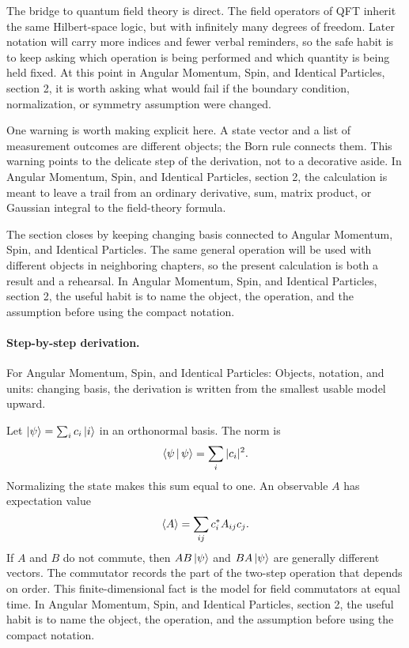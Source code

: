 The bridge to quantum field theory is direct.  The field operators of QFT inherit the same Hilbert-space logic, but with infinitely many degrees of freedom.  Later notation will carry more indices and fewer verbal reminders, so the safe habit is to keep asking which operation is being performed and which quantity is being held fixed.  At this point in Angular Momentum, Spin, and Identical Particles, section 2, it is worth asking what would fail if the boundary condition, normalization, or symmetry assumption were changed.

One warning is worth making explicit here.  A state vector and a list of measurement outcomes are different objects; the Born rule connects them.  This warning points to the delicate step of the derivation, not to a decorative aside.  In Angular Momentum, Spin, and Identical Particles, section 2, the calculation is meant to leave a trail from an ordinary derivative, sum, matrix product, or Gaussian integral to the field-theory formula.

The section closes by keeping changing basis connected to Angular Momentum, Spin, and Identical Particles.  The same general operation will be used with different objects in neighboring chapters, so the present calculation is both a result and a rehearsal.  In Angular Momentum, Spin, and Identical Particles, section 2, the useful habit is to name the object, the operation, and the assumption before using the compact notation.



\paragraph{Step-by-step derivation.}

For Angular Momentum, Spin, and Identical Particles: Objects, notation, and units: changing basis, the derivation is written from the smallest usable model upward.

Let \(\left|\psi\right\rangle=\sum_i c_i\left|i\right\rangle\) in an orthonormal basis.  The norm is
\[
  \left\langle \psi\,\middle|\,\psi\right\rangle=\sum_i |c_i|^2.
\]
Normalizing the state makes this sum equal to one.  An observable \(A\) has expectation value
\[
  \left\langle A\right\rangle=\sum_{ij}c_i^*A_{ij}c_j.
\]
If \(A\) and \(B\) do not commute, then \(AB\left|\psi\right\rangle\) and \(BA\left|\psi\right\rangle\) are generally different vectors.  The commutator records the part of the two-step operation that depends on order.  This finite-dimensional fact is the model for field commutators at equal time.  In Angular Momentum, Spin, and Identical Particles, section 2, the useful habit is to name the object, the operation, and the assumption before using the compact notation.

